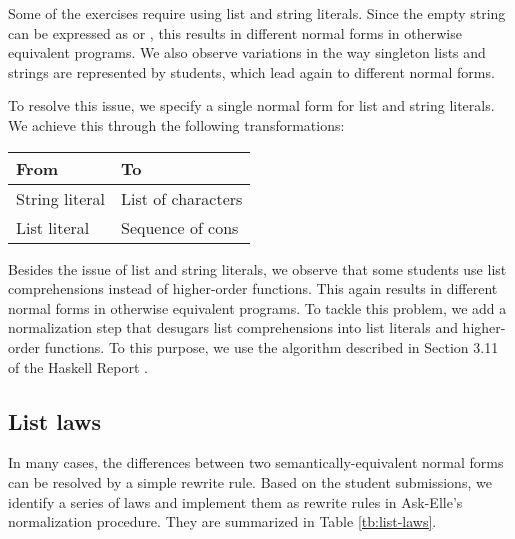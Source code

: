 Some of the exercises require using list and string literals. Since the empty string can be expressed as  or \haskell{[]}, this results in different normal forms in otherwise equivalent programs. We also observe variations in the way singleton lists and strings are represented by students, which lead again to different normal forms.

To resolve this issue, we specify a single normal form for list and string literals. We achieve this through the following transformations:

\begin{center}
\begin{tabular}{ m{10em} | m{10em} }
    From & To \\
    \hline
    String literal & List of characters \\
    \hline
    List literal & Sequence of cons
\end{tabular}
\end{center}

Besides the issue of list and string literals, we observe that some students use list comprehensions instead of higher-order functions. This again results in different normal forms in otherwise equivalent programs. To tackle this problem, we add a normalization step that desugars list comprehensions into list literals and higher-order functions. To this purpose, we use the algorithm described in Section 3.11 of the Haskell Report \cite{2010haskell}.

\subsection{List laws}

In many cases, the differences between two semantically-equivalent normal forms can be resolved by a simple rewrite rule. Based on the student submissions, we identify a series of laws and implement them as rewrite rules in Ask-Elle's normalization procedure. They are summarized in Table \ref{tb:list-laws}.

